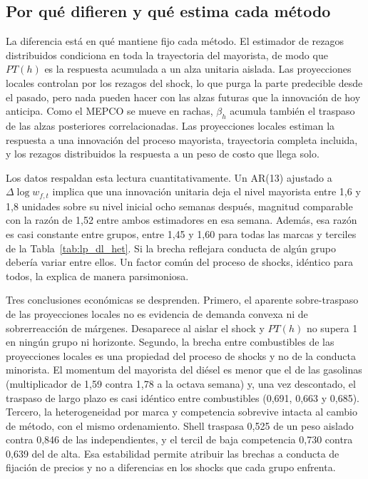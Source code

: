 \documentclass[11pt]{article}
\begin{document}
\subsection{Por qué difieren y qué estima cada método}
\label{sec:dl_interpretacion}

La diferencia está en qué mantiene fijo cada método. El estimador de rezagos
distribuidos condiciona en toda la trayectoria del mayorista, de modo que
$PT(h)$ es la respuesta acumulada a un alza unitaria aislada. Las
proyecciones locales controlan por los rezagos del shock, lo que purga la
parte predecible desde el pasado, pero nada pueden hacer con las alzas
futuras que la innovación de hoy anticipa. Como el MEPCO se mueve en rachas,
$\beta_h$ acumula también el traspaso de las alzas posteriores
correlacionadas. Las proyecciones locales estiman la respuesta a una
innovación del proceso mayorista, trayectoria completa incluida, y los
rezagos distribuidos la respuesta a un peso de costo que llega solo.

Los datos respaldan esta lectura cuantitativamente. Un AR(13) ajustado a
$\Delta \log w_{f,t}$ implica que una innovación unitaria deja el nivel
mayorista entre 1,6 y 1,8 unidades sobre su nivel inicial ocho semanas
después, magnitud comparable con la razón de 1,52 entre ambos estimadores en
esa semana. Además, esa razón es casi constante entre grupos, entre 1,45 y
1,60 para todas las marcas y terciles de la Tabla~\ref{tab:lp_dl_het}. Si la
brecha reflejara conducta de algún grupo debería variar entre ellos. Un
factor común del proceso de shocks, idéntico para todos, la explica de
manera parsimoniosa.

Tres conclusiones económicas se desprenden. Primero, el aparente
sobre-traspaso de las proyecciones locales no es evidencia de demanda
convexa ni de sobrerreacción de márgenes. Desaparece al aislar el shock y
$PT(h)$ no supera 1 en ningún grupo ni horizonte. Segundo, la brecha entre
combustibles de las proyecciones locales es una propiedad del proceso de
shocks y no de la conducta minorista. El momentum del mayorista del diésel
es menor que el de las gasolinas (multiplicador de 1,59 contra 1,78 a la
octava semana) y, una vez descontado, el traspaso de largo plazo es casi
idéntico entre combustibles (0,691, 0,663 y 0,685). Tercero, la
heterogeneidad por marca y competencia sobrevive intacta al cambio de
método, con el mismo ordenamiento. Shell traspasa 0,525 de un peso aislado
contra 0,846 de las independientes, y el tercil de baja competencia 0,730
contra 0,639 del de alta. Esa estabilidad permite atribuir las brechas a
conducta de fijación de precios y no a diferencias en los shocks que cada
grupo enfrenta.
\end{document}
